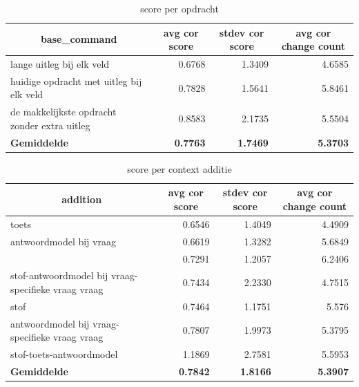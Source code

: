 \documentclass[12pt]{article}
\begin{document}
\noindent\begin{table}[H]
\caption{score per opdracht}
\label{fig:score-command}
\begin{tabularx}{\textwidth}{X *3{r}}
    \toprule
    \multicolumn{1}{c}{\textbf{base\_command}} & \multicolumn{1}{c}{\textbf{avg cor score}} & \multicolumn{1}{c}{\textbf{stdev cor score}} & \multicolumn{1}{c}{\textbf{avg cor change count}} \\
    \midrule
    lange uitleg bij elk veld & 0.6768 & 1.3409 & 4.6585 \\
    huidige opdracht met uitleg bij elk veld & 0.7828 & 1.5641 & 5.8461 \\
    de makkelijkste opdracht zonder extra uitleg & 0.8583 & 2.1735 & 5.5504 \\
    \midrule
    \textbf{Gemiddelde} & \textbf{0.7763} & \textbf{1.7469} & \textbf{5.3703} \\
    \bottomrule
\end{tabularx}%
\end{table}


\noindent\begin{table}[H]
\caption{score per context additie}
\label{fig:score-addition}
\begin{tabularx}{\textwidth}{X *3{r}}
    \toprule
    \multicolumn{1}{c}{\textbf{addition}} & \multicolumn{1}{c}{\textbf{avg cor score}} & \multicolumn{1}{c}{\textbf{stdev cor score}} & \multicolumn{1}{c}{\textbf{avg cor change count}} \\
    \midrule
    toets & 0.6546 & 1.4049 & 4.4909 \\
    antwoordmodel bij vraag & 0.6619 & 1.3282 & 5.6849 \\
    & 0.7291 & 1.2057 & 6.2406 \\
    stof-antwoordmodel bij vraag-specifieke vraag vraag & 0.7434 & 2.2330 & 4.7515 \\
    stof & 0.7464 & 1.1751 & 5.576 \\
    antwoordmodel bij vraag-specifieke vraag vraag & 0.7807 & 1.9973 & 5.3795 \\
    stof-toets-antwoordmodel & 1.1869 & 2.7581 & 5.5953 \\
    \midrule
    \textbf{Gemiddelde} & \textbf{0.7842} & \textbf{1.8166} & \textbf{5.3907} \\
    \bottomrule
\end{tabularx}%
\end{table}
\end{document}
